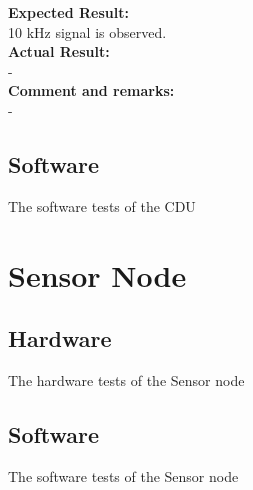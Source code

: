 \textbf{Expected Result:}\\
10 kHz signal is observed.\\

\textbf{Actual Result:}\\
-\\

\textbf{Comment and remarks:}\\
-\\

\subsection{Software}
The software tests of the CDU

\section{Sensor Node}
\subsection{Hardware}
The hardware tests of the Sensor node
\subsection{Software}
The software tests of the Sensor node
